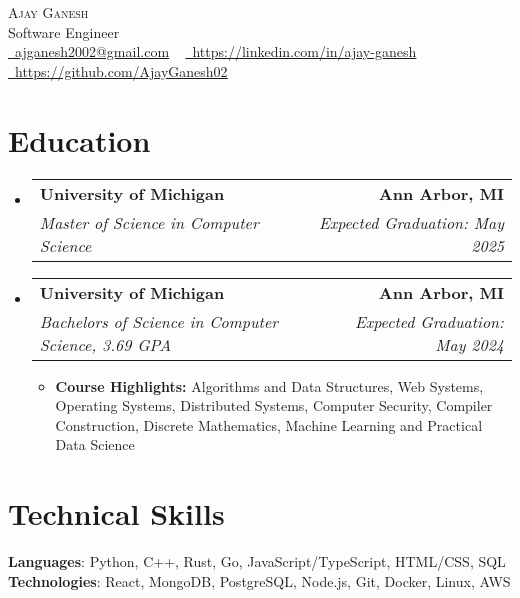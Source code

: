 \documentclass[letterpaper,11pt]{article}
\makeatletter
\newcommand{\resumeItem}[1]{
  \item\small{
    {#1 \vspace{-3pt}}
  }
}
\newcommand{\resumeSubheading}[4]{
  \vspace{-3pt}\item
    \begin{tabular*}{1.0\textwidth}[t]{l@{\extracolsep{\fill}}r}
      \textbf{#1} & \textbf{\small #2} \\
      \textit{\small#3} & \textit{\small #4} \\
    \end{tabular*}\vspace{-7pt}
}
\newcommand{\resumeSubHeadingListStart}{\begin{itemize}[leftmargin=0.0in, label={}]}
\newcommand{\resumeSubHeadingListEnd}{\end{itemize}}
\newcommand{\resumeItemListStart}{\begin{itemize}}
\newcommand{\resumeItemListEnd}{\end{itemize}\vspace{0pt}}
\makeatother
\begin{document}
    \begin{center}
        {\Huge\scshape Ajay Ganesh} 
        \\ Software Engineer\\
        \small
        \href{mailto:ajganesh2002@gmail.com}{\raisebox{-0.2\height}\faEnvelope\  \underline{ajganesh2002@gmail.com}} ~ 
        \href{https://www.linkedin.com/in/ajay-ganesh/}{\raisebox{-0.2\height}\faLinkedin\ \underline{https://linkedin.com/in/ajay-ganesh}}  ~
        \href{https://github.com/AjayGanesh02}{\raisebox{-0.2\height}\faGithub\ \underline{https://github.com/AjayGanesh02}}
    \end{center}

\section{Education}
  \resumeSubHeadingListStart
  
    \resumeSubheading
    {University of Michigan}{Ann Arbor, MI}
    {Master of Science in Computer Science}{Expected Graduation: May 2025}

    \resumeSubheading
    {University of Michigan}{Ann Arbor, MI}
    {Bachelors of Science in Computer Science, 3.69 GPA}{Expected Graduation: May 2024}
        \resumeItemListStart
            \resumeItem{\textbf{Course Highlights:} Algorithms and Data Structures, Web Systems, Operating Systems, Distributed Systems, Computer Security, Compiler Construction, Discrete Mathematics, Machine Learning and Practical Data Science}
        \resumeItemListEnd
        
  \resumeSubHeadingListEnd

\section{Technical Skills}

    \vspace{-7pt}
    \begin{itemize}
    [leftmargin=0.15in, label={}]\small{\item{
        \textbf{Languages}{: Python, C++, Rust, Go, JavaScript/TypeScript, HTML/CSS, SQL} \\
        \textbf{Technologies}{: React, MongoDB, PostgreSQL, Node.js, Git, Docker, Linux, AWS} \\}}
    \end{itemize}
\end{document}
